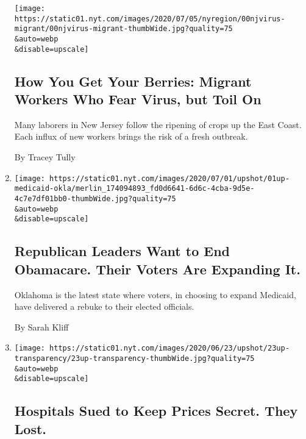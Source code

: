 \begin{enumerate}
  \texttt{[image: https://static01.nyt.com/images/2020/07/05/nyregion/00njvirus-migrant/00njvirus-migrant-thumbWide.jpg?quality=75\\\&auto=webp\\\&disable=upscale]}

  \hypertarget{how-you-get-your-berries-migrant-workers-who-fear-virus-but-toil-on}{%
  \subsection{How You Get Your Berries: Migrant Workers Who Fear Virus,
  but Toil
  On}\label{how-you-get-your-berries-migrant-workers-who-fear-virus-but-toil-on}}

  Many laborers in New Jersey follow the ripening of crops up the East
  Coast. Each influx of new workers brings the risk of a fresh outbreak.

  By Tracey Tully
\item
  \href{/2020/07/01/upshot/oklahoma-obamacare-Republican-voters-expand.html}{}

  \texttt{[image: https://static01.nyt.com/images/2020/07/01/upshot/01up-medicaid-okla/merlin\_174094893\_fd0d6641-6d6c-4cba-9d5e-4c7e7df01bb0-thumbWide.jpg?quality=75\\\&auto=webp\\\&disable=upscale]}

  \hypertarget{republican-leaders-want-to-end-obamacare-their-voters-are-expanding-it}{%
  \subsection{Republican Leaders Want to End Obamacare. Their Voters Are
  Expanding
  It.}\label{republican-leaders-want-to-end-obamacare-their-voters-are-expanding-it}}

  Oklahoma is the latest state where voters, in choosing to expand
  Medicaid, have delivered a rebuke to their elected officials.

  By Sarah Kliff
\item
  \href{/2020/06/23/upshot/hospitals-lost-price-transparency-lawsuit.html}{}

  \texttt{[image: https://static01.nyt.com/images/2020/06/23/upshot/23up-transparency/23up-transparency-thumbWide.jpg?quality=75\\\&auto=webp\\\&disable=upscale]}

  \hypertarget{hospitals-sued-to-keep-prices-secret-they-lost}{%
  \subsection{Hospitals Sued to Keep Prices Secret. They
  Lost.}\label{hospitals-sued-to-keep-prices-secret-they-lost}}


\end{enumerate}
